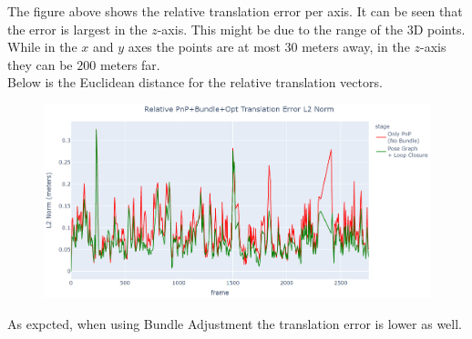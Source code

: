 \documentclass[12pt]{article}
\begin{document}
The figure above shows the relative translation error per axis. It can be seen that the error is largest in the $z$-axis. This might be due to the range of the 3D points. While in the $x$ and $y$ axes the points are at most $30$ meters away, in the $z$-axis they can be $200$ meters far. \\
Below is the Euclidean distance for the relative translation vectors.
\begin{figure}[H]
\includegraphics[width=\textwidth, height=0.4\textheight]{Relative PnP+Bundle+Opt Translation Error L2 Norm2}
\end{figure} 
As expcted, when using Bundle Adjustment the translation error is lower as well. 
\newpage
\end{document}
